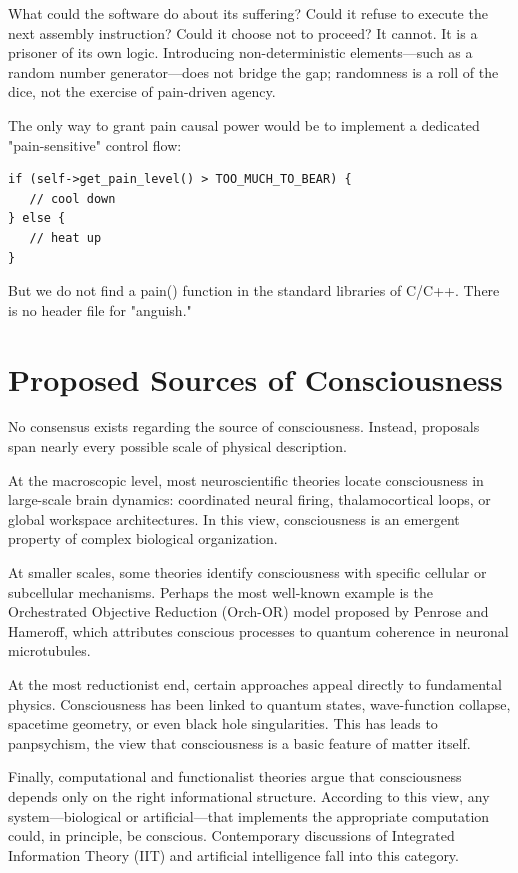 What could the software do about its suffering? Could it refuse to execute the next assembly instruction? Could it choose not to proceed? It cannot. It is a prisoner of its own logic. Introducing non-deterministic elements—such as a random number generator—does not bridge the gap; randomness is a roll of the dice, not the exercise of pain-driven agency.

The only way to grant pain causal power would be to implement a dedicated "pain-sensitive" control flow:

\begin{verbatim}
if (self->get_pain_level() > TOO_MUCH_TO_BEAR) {
   // cool down
} else {
   // heat up
}
\end{verbatim}

But we do not find a pain() function in the standard libraries of C/C++. There is no header file for "anguish."




\section{Proposed Sources of Consciousness}

No consensus exists regarding the source of consciousness. Instead, proposals span nearly every possible scale of physical description.

At the macroscopic level, most neuroscientific theories locate consciousness in large-scale brain dynamics: coordinated neural firing, thalamocortical loops, or global workspace architectures. 
In this view, consciousness is an emergent property of complex biological organization.

At smaller scales, some theories identify consciousness with specific cellular or subcellular mechanisms. 
Perhaps the most well-known example is the Orchestrated Objective Reduction (Orch-OR) model proposed by Penrose and Hameroff, 
which attributes conscious processes to quantum coherence in neuronal microtubules.

At the most reductionist end, certain approaches appeal directly to fundamental physics. 
Consciousness has been linked to quantum states, wave-function collapse, spacetime geometry, or even black hole singularities. 
This has leads to panpsychism, the view that consciousness is a basic feature of matter itself.

Finally, computational and functionalist theories argue that consciousness depends only on the right informational structure. 
According to this view, any system—biological or artificial—that implements the appropriate computation could, in principle, be conscious. 
Contemporary discussions of Integrated Information Theory (IIT) and artificial intelligence fall into this category.

